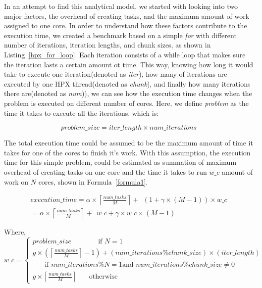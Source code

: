 In an attempt to find this analytical model, we started with looking into two major factors, the overhead of creating tasks, and the maximum amount of work assigned to one core. 
In order to understand how these factors contribute to the execution time, we created a benchmark based on a simple \textit{for} with different number of iterations, iteration lengths, and chunk sizes, as shown in Listing~\ref{hpx_for_loop}. 
Each iteration consists of a while loop that makes sure the iteration lasts a certain amount ot time. This way, knowing how long it would take to execute one iteration(denoted as \textit{iter}), how many of iterations are executed by one HPX thread(denoted as \textit{chunk}), and finally how many iterations there are(denoted as \textit{num})), we can see how the execution time changes when the problem is executed on different number of cores. Here, we define \textit{problem} as the time it takes to execute all the iterations, which is:

\begin{equation}\label{problem_size}
problem\_size = iter\_length\times{num\_iterations}
\end{equation}

The total execution time could be assumed to be the maximum amount of time it takes for one of the cores to finish it's work. With this assumption, the execution time for this simple problem, could be estimated as summation of maximum overhead of creating tasks on one core and the time it takes to run $w\_c$ amount of work on $N$ cores, shown in Formula~\ref{formula1}.

\begin{equation}\label{formula1}
\begin{aligned}
execution\_time = \alpha\times\left \lceil{\frac{num\_{tasks}}{M}}\right \rceil +\:\:{(1+\gamma\times{(M-1)})\times{w\_c}}\\
=\alpha\times\left \lceil{\frac{num\_{tasks}}{M}}\right \rceil +\:\:{w\_c+\gamma\times{w\_c}\times{(M-1)}}
\end{aligned}
\end{equation}

Where, 
\begin{equation}\label{formula2}
w\_c =\left\{
\begin{aligned}
problem\_{size} \:\:\:\:\:\:\:\:\:\:\:\:\:\:\:\:        \text{ if } N=1\\
g\times(\left \lceil{\frac{num\_{tasks}}{M}}\right \rceil-1)+(num\_{iterations}\%chunk\_{size})\times(iter\_{length}) \\ \:\:\:\:\:\:\:\:       \text{if }num\_{iterations}\%N=1\text{and }num\_{iterations}\%chunk\_{size}\neq0\\
g\times\left \lceil{\frac{num\_{tasks}}{M}}\right \rceil  \:\:\:\:\:\:\:\:       \text{otherwise}
\end{aligned}
\right.
\end{equation}

